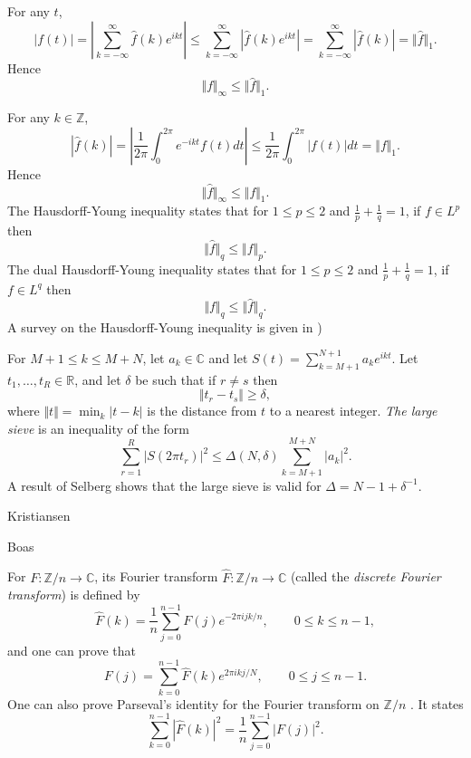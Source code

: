 \documentclass{article}
\newcommand{\norm}[1]{\Vert #1 \Vert}
\begin{document}
For any $t$,
\[
|f(t)|=\left| \sum_{k=-\infty}^\infty \hat{f}(k)e^{ikt} \right| \leq \sum_{k=-\infty}^\infty |\hat{f}(k)e^{ikt}|=\sum_{k=-\infty}^\infty |\hat{f}(k)|=\norm{\hat{f}}_1.
\]
Hence
\[
\norm{f}_\infty \leq \norm{\hat{f}}_1.
\]








For any $k \in \mathbb{Z}$,
\[
|\hat{f}(k)| = \left| \frac{1}{2\pi} \int_0^{2\pi} e^{-ikt} f(t) dt \right|
\leq \frac{1}{2\pi} \int_0^{2\pi} |f(t)| dt = \norm{f}_1.
\]
Hence
\[
\norm{\hat{f}}_\infty \leq \norm{f}_1.
\]
The Hausdorff-Young inequality \cite[p.~57, Corollary~2.4]{steinIV} states that for $1 \leq p \leq 2$ and $\frac{1}{p}+\frac{1}{q}=1$, if $f \in L^p$ then
\[
\norm{\hat{f}}_q \leq \norm{f}_p.
\]
The dual Hausdorff-Young inequality \cite[p.~58, Corollary~2.5]{steinIV} states that for $1 \leq p \leq 2$ and $\frac{1}{p}+\frac{1}{q}=1$, if $f \in L^q$ then
\[
\norm{f}_q \leq \norm{\hat{f}}_q.
\]
A survey on the Hausdorff-Young inequality is given in \cite{MR1348739}) 





For $M+1 \leq k \leq M+N$, let $a_k \in \mathbb{C}$ and let
$S(t)=\sum_{k=M+1}^{N+1} a_k e^{ikt}$. Let $t_1,\ldots,t_R \in \mathbb{R}$, and let $\delta$ be such that
if $r \neq s$ then
\[
\norm{t_r-t_s} \geq \delta,
\]
where $\norm{t}=\min_k | t-k|$ is the distance from $t$ to a nearest integer. 
{\em The large sieve} \cite{sieve} is an inequality of the form
\[
\sum_{r=1}^R |S(2\pi t_r)|^2 \leq \Delta(N,\delta) \sum_{k=M+1}^{M+N} |a_k|^2.
\]
A result of Selberg \cite[p.~559, Theorem~3]{sieve} shows that the large sieve is valid for $\Delta=N-1+\delta^{-1}$.

Kristiansen \cite{MR0340916} 

Boas \cite{MR0023366}






For $F:\mathbb{Z}/n \to \mathbb{C}$, its Fourier transform $\hat{F}:\mathbb{Z}/n \to \mathbb{C}$ (called the 
{\em discrete Fourier transform}) is defined by
\[
\hat{F}(k)=\frac{1}{n} \sum_{j=0}^{n-1} F(j) e^{-2\pi ijk/n}, \qquad 0 \leq k \leq n-1,
\]
and one can prove \cite[p.~223, Theorem~1.2]{steinI} that 
\[
F(j)=\sum_{k=0}^{n-1} \hat{F}(k) e^{2\pi ikj/N}, \qquad 0 \leq j \leq n-1.
\]
One can also prove Parseval's identity for the Fourier transform on $\mathbb{Z}/n$ \cite[p.~223, Theorem ~1.2]{steinI}. It states 
\[
\sum_{k=0}^{n-1} |\hat{F}(k)|^2=\frac{1}{n}\sum_{j=0}^{n-1} |F(j)|^2.
\]
\end{document}
